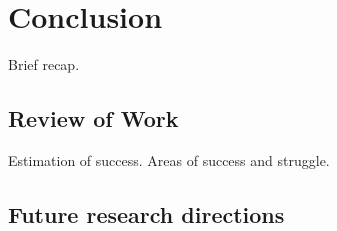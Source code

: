 
\chapter{Conclusion} \label{ch:conclusion}

Brief recap.

\section{Review of Work}

Estimation of success. Areas of success and struggle.

\section{Future research directions} \label{sec:future-research-directions}

